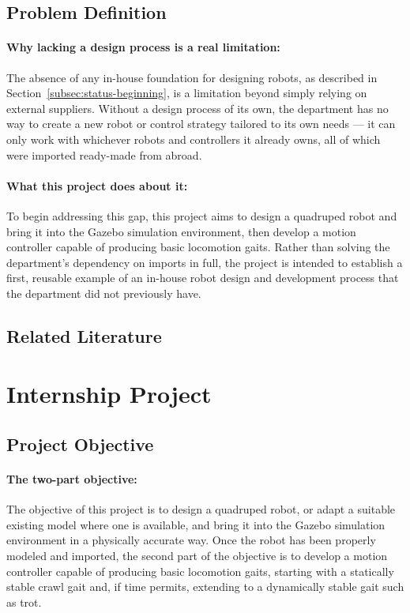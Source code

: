 \documentclass[12pt]{article}
\begin{document}
\subsection{Problem Definition}
\label{subsec:problem-definition}
\paragraph{Why lacking a design process is a real limitation:} The absence of any in-house foundation for designing robots, as described in Section~\ref{subsec:status-beginning}, is a limitation beyond simply relying on external suppliers. Without a design process of its own, the department has no way to create a new robot or control strategy tailored to its own needs — it can only work with whichever robots and controllers it already owns, all of which were imported ready-made from abroad.
\paragraph{What this project does about it:} To begin addressing this gap, this project aims to design a quadruped robot and bring it into the Gazebo simulation environment, then develop a motion controller capable of producing basic locomotion gaits. Rather than solving the department's dependency on imports in full, the project is intended to establish a first, reusable example of an in-house robot design and development process that the department did not previously have.


\subsection{Related Literature}
\label{subsec:related-literature}


\section{Internship Project}
\label{sec:internship-project}
\subsection{Project Objective}
\label{subsec:project-objective}
\paragraph{The two-part objective:} The objective of this project is to design a quadruped robot, or adapt a suitable existing model where one is available, and bring it into the Gazebo simulation environment in a physically accurate way. Once the robot has been properly modeled and imported, the second part of the objective is to develop a motion controller capable of producing basic locomotion gaits, starting with a statically stable crawl gait and, if time permits, extending to a dynamically stable gait such as trot.
\end{document}

